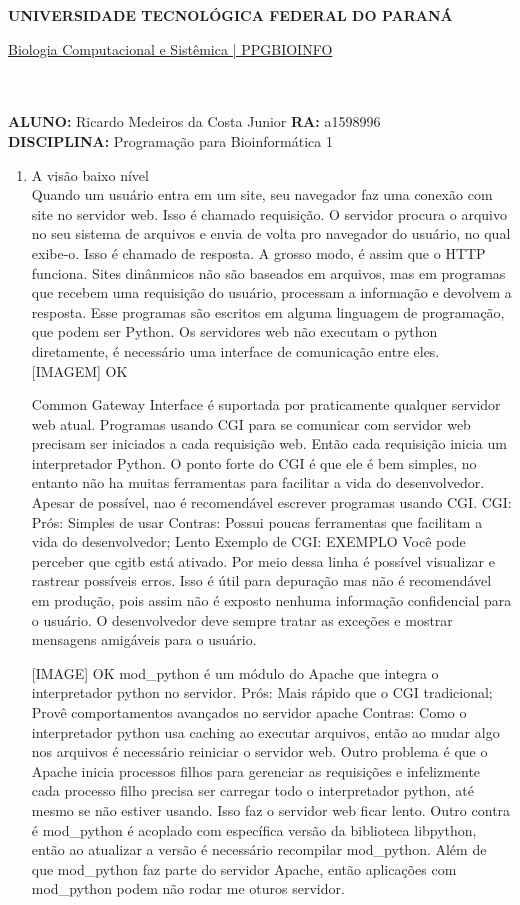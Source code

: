 \documentclass[a4paper, 12pt]{article}
\begin{document}
\textbf{UNIVERSIDADE TECNOLÓGICA FEDERAL DO PARANÁ}\\
\centerline{\underline{Biologia Computacional e Sistêmica | PPGBIOINFO}}\\\\
\textbf{ALUNO:} Ricardo Medeiros da Costa Junior   \textbf{RA:} a1598996 \\
\textbf{DISCIPLINA:} Programação para Bioinformática 1 \\
\begin{enumerate} 
\item A visão baixo nível\\
  Quando um usuário entra em um site, seu navegador faz uma conexão com site no servidor web. Isso é chamado requisição. O servidor procura o arquivo no seu sistema de arquivos e envia de volta pro navegador do usuário, no qual exibe-o. Isso é chamado de resposta. A grosso modo, é assim que o HTTP funciona.
  Sites dinânmicos não são baseados em arquivos, mas em programas que recebem uma requisição do usuário, processam a informação e devolvem a resposta. Esse programas são escritos em alguma linguagem de programação, que podem ser Python.
  Os servidores web não executam o python diretamente, é necessário uma interface de comunicação entre eles.
  [IMAGEM] OK

  Common Gateway Interface é suportada por praticamente qualquer servidor web atual. Programas usando CGI para se comunicar com servidor web precisam ser iniciados a cada requisição web. Então cada requisição inicia um interpretador Python.
  O ponto forte do CGI é que ele é bem simples, no entanto não ha muitas ferramentas para facilitar a vida do desenvolvedor.
  Apesar de possível, nao é recomendável escrever programas usando CGI.
  CGI: Prós: Simples de usar
  Contras: Possui poucas ferramentas que facilitam a vida do desenvolvedor;
           Lento
  Exemplo de CGI:
  EXEMPLO
  Você pode perceber que cgitb está ativado. Por meio dessa linha é possível visualizar e rastrear possíveis erros. Isso é útil para depuração mas não é recomendável em produção, pois assim não é exposto nenhuma informação confidencial para o usuário. O desenvolvedor deve sempre tratar as exceções e mostrar mensagens amigáveis para o usuário.

  [IMAGE] OK
  mod_python é um módulo do Apache que integra o interpretador python no servidor.
  Prós: Mais rápido que o CGI tradicional; Provê comportamentos avançados no servidor apache
  Contras: Como o interpretador python usa caching ao executar arquivos, então ao mudar algo nos arquivos é necessário reiniciar o servidor web. Outro problema é que o Apache inicia processos filhos para gerenciar as requisições e infelizmente cada processo filho precisa ser carregar todo o interpretador python, até mesmo se não estiver usando. Isso faz o servidor web ficar lento. Outro contra é mod_python é acoplado com específica versão da biblioteca libpython, então ao atualizar a versão é necessário recompilar mod_python. Além de que mod_python faz parte do servidor Apache, então aplicações com mod_python podem não rodar me oturos servidor.


\end{enumerate}
\end{document}
